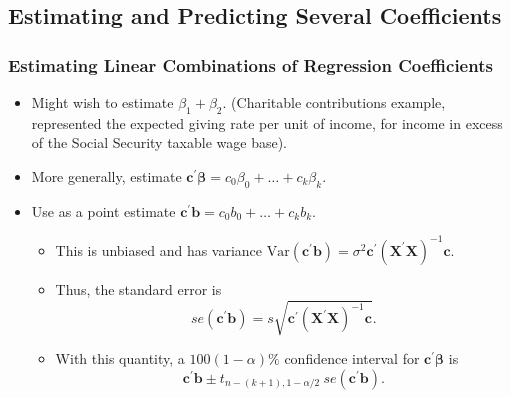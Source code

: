 \subsection{Estimating and Predicting Several Coefficients}

\begin{frame}%
 \frametitle{Estimating Linear Combinations of Regression Coefficients}
   \begin{itemize}
 \item Might wish to estimate $\beta_1 + \beta_2$. (Charitable
 contributions example, represented the expected giving rate per
 unit of income, for income in excess of the Social Security taxable wage base).
 \item More generally, estimate $\mathbf{c}^{\prime} \boldsymbol \beta
= c_0 \beta_0 + \ldots + c_k \beta_k.$
\item Use as a point estimate $\mathbf{c}^{\prime} \mathbf{b}
= c_0 b_0 + \ldots + c_k b_k.$

  \begin{itemize}
 \item This is unbiased and has variance  $\mathrm{Var}\left( \mathbf{c}^{\prime
}\mathbf{b}\right) =\sigma ^{2} \mathbf{c}^{\prime
}(\mathbf{X^{\prime} X})^{-1}\mathbf{c}$.
 \item Thus, the standard error is
 \begin{equation*}
se\left( \mathbf{c}^{\prime }\mathbf{b}\right)
=s\sqrt{\mathbf{c}^{\prime }(\mathbf{X^{\prime }X})^{-1}\mathbf{c}}.
\end{equation*}
\item With this quantity, a $100(1-\alpha ) \%$ confidence interval
for $\mathbf{c}^{\prime } \boldsymbol \beta$ is
\begin{equation*}
\mathbf{c}^{\prime }\mathbf{b}\pm t_{n-(k+1),1-\alpha /2}
~se(\mathbf{c}^{\prime }\mathbf{b}).
\end{equation*}
  \end{itemize}
    \end{itemize}
\end{frame}


